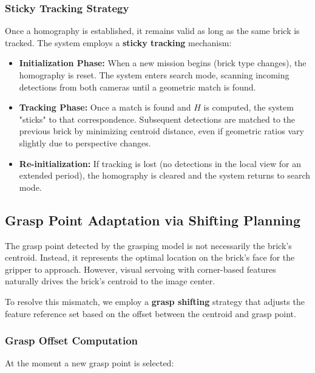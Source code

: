 \subsubsection{Sticky Tracking Strategy}
Once a homography is established, it remains valid as long as the same brick is tracked. The system employs a \textbf{sticky tracking} mechanism:

\begin{itemize}
    \item \textbf{Initialization Phase:} When a new mission begins (brick type changes), the homography is reset. The system enters search mode, scanning incoming detections from both cameras until a geometric match is found.
    
    \item \textbf{Tracking Phase:} Once a match is found and $H$ is computed, the system "sticks" to that correspondence. Subsequent detections are matched to the previous brick by minimizing centroid distance, even if geometric ratios vary slightly due to perspective changes.
    
    \item \textbf{Re-initialization:} If tracking is lost (no detections in the local view for an extended period), the homography is cleared and the system returns to search mode.
\end{itemize}

\subsection{Grasp Point Adaptation via Shifting Planning}

The grasp point detected by the grasping model is not necessarily the brick's centroid. Instead, it represents the optimal location on the brick's face for the gripper to approach. However, visual servoing with corner-based features naturally drives the brick's centroid to the image center.

To resolve this mismatch, we employ a \textbf{grasp shifting} strategy that adjusts the feature reference set based on the offset between the centroid and grasp point.

\subsubsection{Grasp Offset Computation}
At the moment a new grasp point is selected:

